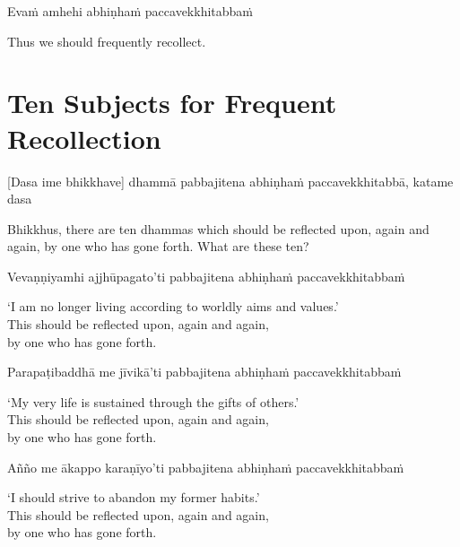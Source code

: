 Evaṁ amhehi abhiṇhaṁ paccavekkhitabbaṁ

\begin{english}
  Thus we should frequently recollect.\\
\end{english}

\section{Ten Subjects for Frequent Recollection}


\begin{leader}
\end{leader}

[Dasa ime bhikkhave] dhammā pabbajitena abhiṇhaṁ paccavekkhitabbā, katame dasa

\begin{english}
  Bhikkhus, there are ten dhammas which should be reflected upon, again and again, by one who has gone forth. What are these ten?
\end{english}

Vevaṇṇiyamhi ajjhūpagato'ti pabbajitena abhiṇhaṁ paccavekkhitabbaṁ

\begin{english}
  `I am no longer living according to worldly aims and values.'\\
  This should be reflected upon, again and again,\\
  by one who has gone forth.
\end{english}

Parapaṭibaddhā me jīvikā'ti pabbajitena abhiṇhaṁ paccavekkhitabbaṁ

\begin{english}
  `My very life is sustained through the gifts of others.'\\
  This should be reflected upon, again and again,\\
  by one who has gone forth.
\end{english}

Añño me ākappo karaṇīyo'ti pabbajitena abhiṇhaṁ paccavekkhitabbaṁ

\begin{english}
  `I should strive to abandon my former habits.'\\
  This should be reflected upon, again and again,\\
  by one who has gone forth.
\end{english}

